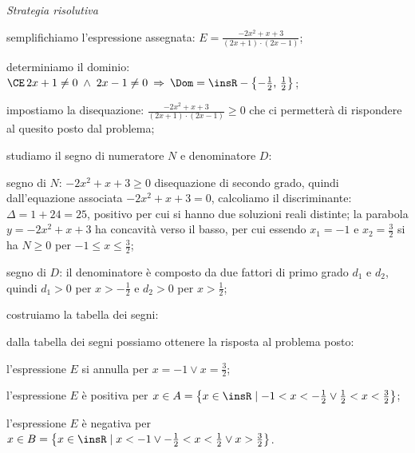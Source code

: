 \begin{exrig}
\begin{esempio}
\emph{Strategia risolutiva}
\begin{enumeratea}
\item semplifichiamo l'espressione assegnata: $E=\frac{-2x^2+x+3}{(2x+1)\cdot (2x-1)}$;
\item determiniamo il dominio: $\CE\, 2x+1\neq 0\;\wedge\; 2x-1\neq 0\:\Rightarrow\: \Dom=\insR-\left\{-\frac 1 2\text{, }\frac 1 2\right\}$;
\item impostiamo la disequazione: $\frac{-2x^2+x+3}{(2x+1)\cdot (2x-1)}\ge 0$ che ci permetterà di rispondere al quesito posto dal problema;
\item studiamo il segno di numeratore $N$ e denominatore $D$:
 \begin{itemize*}
\item segno di $N$: $-2x^2+x+3\ge 0$ disequazione di secondo grado, quindi dall'equazione associata $-2x^2+x+3=0$, calcoliamo il discriminante: $\Delta =1+24=25$, positivo per cui si hanno due soluzioni reali distinte; la parabola $y=-2x^2+x+3$ ha concavità verso il basso, per cui essendo $x_1=-1$ e $x_2=\frac 3 2$ si ha $N\ge 0$ per $-1\le x\le \frac 3 2$;
\item segno di $D$: il denominatore è composto da due fattori di primo grado $d_1$ e $d_2$, quindi $d_1>0$ per $x>-\frac 1 2$ e $d_2>0$ per $x>\frac 1 2$;
 \end{itemize*}
\pagebreak
\item costruiamo la tabella dei segni:
\begin{center}
 
\end{center}
\item dalla tabella dei segni possiamo ottenere la risposta al problema posto:
\begin{itemize*}
\item l'espressione $E$ si annulla per $x=-1\vee x=\frac 3 2$;
\item l'espressione $E$ è positiva per $x\in A=\left\{x\in \insR \mid -1<x<-\frac 1 2\vee \frac 1 2<x<\frac 3 2\right\}$;
\item l'espressione $E$ è negativa per $x\in B=\left\{x\in \insR \mid x<-1\vee -\frac 1 2<x<\frac 1 2\vee x>\frac 3 2\right\}$.
\end{itemize*}
\end{enumeratea}
\end{esempio}


\end{exrig}
